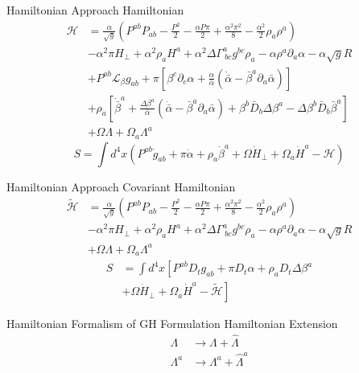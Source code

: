 \documentclass[xcolor=dvipsnames]{beamer}
\begin{document}
	\begin{frame}{Hamiltonian Approach}
		Hamiltonian
		\begin{align*}
		\mathscr{H} &= \frac{\alpha}{\sqrt{g}}\left(P^{ab}P_{ab} - \frac{P^{2}}{2} - \frac{\alpha P \pi}{2} + \frac{\alpha^{2}\pi^{2}}{8} - \frac{\alpha^{2}}{2}\rho_{a}\rho^{a}\right)\\
		& -\alpha^{2}\pi H_{\perp} + \alpha^{2}\rho_{a}H^{a} + \alpha^{2}\Delta\Gamma^{a}_{~bc}g^{bc}\rho_{a} - \alpha \rho^{a}\partial_{a}\alpha - \alpha\sqrt{g}R\\
		& + P^{ab} \mathcal{L}_{\beta}g_{ab} + \pi \left[\beta^{c}\partial_{c}\alpha + \frac{\alpha}{{\bar \alpha}}\left({\dot {\bar \alpha}} - {\bar \beta}^{a}\partial_{a}{\bar \alpha}\right)\right]\\
		& + \rho_{a}\left[{\dot {\bar \beta}}^{a} + \frac{\Delta \beta^{a}}{{\bar \alpha}}\left({\dot {\bar \alpha}} - {\bar \beta}^{a}\partial_{a}{\bar \alpha}\right) + \beta^{b}{\bar D}_{b}\Delta \beta^{a} - \Delta \beta^{b} {\bar D}_{b}{\bar \beta}^{a}\right]\\
		& + \Omega \Lambda + \Omega_{a}\Lambda^{a}
		\end{align*}
		\[
			S =\int d^{4}x \left(P^{ab}{\dot g}_{ab} + \pi {\dot \alpha} + \rho_{a}{\dot \beta}^{a} + \Omega{\dot H_{\perp}} + \Omega_{a}{\dot H}^{a} - \mathscr{H}\right)
		\]
	\end{frame}
	\begin{frame}{Hamiltonian Approach}
		Covariant Hamiltonian
		\begin{align*}
		\tilde{\mathscr{H}} & = \frac{\alpha}{\sqrt{g}}\left(P^{ab}P_{ab} - \frac{P^{2}}{2} - \frac{\alpha P \pi}{2} + \frac{\alpha^{2}\pi^{2}}{8} - \frac{\alpha^{2}}{2}\rho_{a}\rho^{a}\right)\\
		& -\alpha^{2}\pi H_{\perp} + \alpha^{2}\rho_{a}H^{a} + \alpha^{2}\Delta\Gamma^{a}_{~bc}g^{bc}\rho_{a} - \alpha \rho^{a}\partial_{a}\alpha - \alpha\sqrt{g}R\\
		& + \Omega\Lambda + \Omega_{a}\Lambda^{a}
		\end{align*}
		\begin{align*}
		S &= \int d^{4}x \left[ P^{ab}D_{t}g_{ab} + \pi D_{t}\alpha + \rho_{a}D_{t}\Delta\beta^{a}\right. \\
		& \left. + \Omega{\dot H}_{\perp} + \Omega_{a}{\dot H}^{a} - \tilde{\mathscr{H}}\right]
		\end{align*}
	\end{frame}
	\begin{frame}{Hamiltonian Formalism of GH Formulation}
		Hamiltonian Extension
		\begin{align*}
			\Lambda &\rightarrow \Lambda + {\hat \Lambda}\\
			\Lambda^{a} &\rightarrow \Lambda^{a} + {\hat \Lambda}^{a}
		\end{align*}
	\end{frame}
\end{document}
